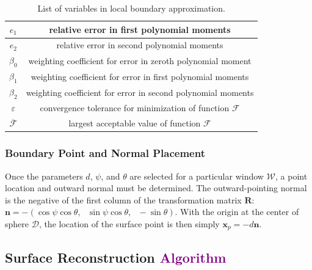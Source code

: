 \begin{table}[t!]
\begin{tabular}{|c||c|}
   $e_1$ & relative error in first polynomial moments \\ \hline
   $e_2$ & relative error in second polynomial moments \\ \hline   
   $\beta_0$ & weighting coefficient for error in zeroth polynomial moment \\ \hline
   $\beta_1$ & weighting coefficient for error in first polynomial moments \\ \hline
   $\beta_2$ & weighting coefficient for error in second polynomial moments \\ \hline 
   $\varepsilon$ & convergence tolerance for minimization of function $\mathcal{F}$ \\ \hline
   $\overline{\mathcal{F}}$ \rule{0mm}{4mm} & largest acceptable value of function $\mathcal{F}$ \\ \hline        
\end{tabular}
\caption{List of variables in local boundary approximation.}
\label{tab:surface}
\end{table}

\subsubsection{Boundary Point and Normal Placement}

Once the parameters $d$, $\psi$, and $\theta$ are selected for a particular window $\mathcal{W}$, a point location and outward normal must be determined. The outward-pointing normal is the negative of the first column of the transformation matrix $\bm{R}$: $\bm{n} = -(\cos\psi\cos\theta,\text{\ }\sin\psi\cos\theta,\text{\ }-\sin\theta)$. With the origin at the center of sphere $\mathcal{D}$, the location of the surface point is then simply $\mathbf{x}_p = -d\bm{n}$.

\subsection{Surface Reconstruction \textcolor{purple}{Algorithm}}
\label{Surface Reconstruction}

